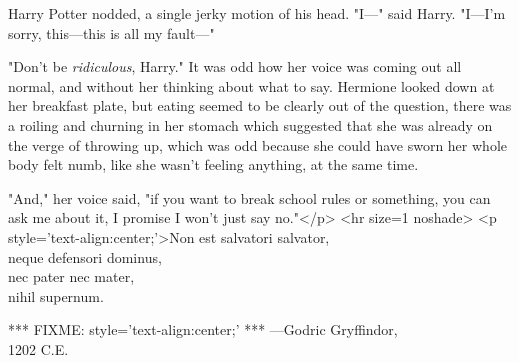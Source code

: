 Harry Potter nodded, a single jerky motion of his head. "I---" said Harry. 
"I---I'm sorry, this---this is all my fault---"

"Don't be \emph{ridiculous}, Harry." It was odd how her voice was coming out 
all normal, and without her thinking about what to say. Hermione looked down at 
her breakfast plate, but eating seemed to be clearly out of the question, there 
was a roiling and churning in her stomach which suggested that she was already 
on the verge of throwing up, which was odd because she could have sworn her 
whole body felt numb, like she wasn't feeling anything, at the same time.

"And," her voice said, "if you want to break school rules or something, you can 
ask me about it, I promise I won't just say no."</p>
<hr size=1 noshade>
<p style='text-align:center;'>Non est salvatori salvator,\\
neque defensori dominus,\\
nec pater nec mater,\\
nihil supernum.

*** FIXME: style='text-align:center;' ***
---Godric Gryffindor,\\
1202 C.E.